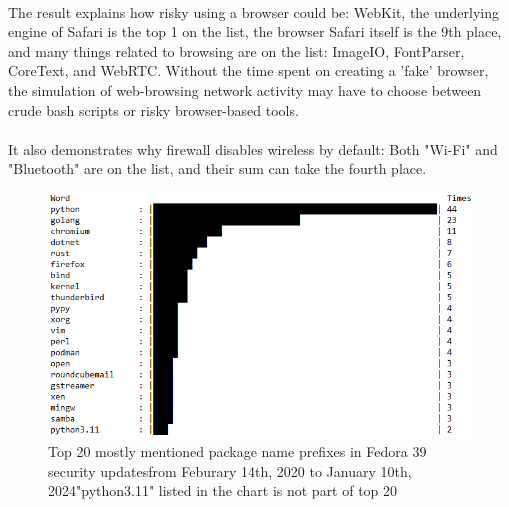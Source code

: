 \documentclass[mscthesis]{usiinfthesis}
\begin{document}
\paragraph{}
The result explains how risky using a browser could be: WebKit, the underlying engine of Safari is the top 1 on the list, the browser Safari itself is the 9th place, and many things related to browsing are on the list: ImageIO, FontParser, CoreText, and WebRTC. Without the time spent on creating a 'fake' browser, the simulation of web-browsing network activity may have to choose between crude bash scripts or risky browser-based tools.
\paragraph{}
It also demonstrates why firewall disables wireless by default: Both "Wi-Fi" and "Bluetooth" are on the list, and their sum can take the fourth place.
\begin{figure}[H]
  \includegraphics[width=\textwidth]{data/fedora_39_security_updates/result.png}
  \caption{Top 20 mostly mentioned package name prefixes in Fedora 39 security updates\newline from Feburary 14th, 2020 to January 10th, 2024\newline "python3.11" listed in the chart is not part of top 20}
  \label{fig:fedora-sec-update}
\end{figure}
\end{document}
